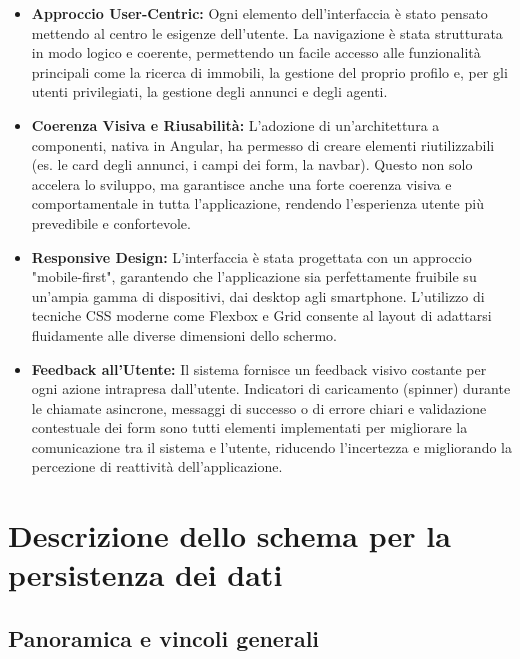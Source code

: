 \begin{itemize}
    \item \textbf{Approccio User-Centric:} Ogni elemento dell'interfaccia è stato pensato mettendo al centro le esigenze dell'utente. La navigazione è stata strutturata in modo logico e coerente, permettendo un facile accesso alle funzionalità principali come la ricerca di immobili, la gestione del proprio profilo e, per gli utenti privilegiati, la gestione degli annunci e degli agenti.

    \item \textbf{Coerenza Visiva e Riusabilità:} L'adozione di un'architettura a componenti, nativa in Angular, ha permesso di creare elementi riutilizzabili (es. le card degli annunci, i campi dei form, la navbar). Questo non solo accelera lo sviluppo, ma garantisce anche una forte coerenza visiva e comportamentale in tutta l'applicazione, rendendo l'esperienza utente più prevedibile e confortevole.

    \item \textbf{Responsive Design:} L'interfaccia è stata progettata con un approccio "mobile-first", garantendo che l'applicazione sia perfettamente fruibile su un'ampia gamma di dispositivi, dai desktop agli smartphone. L'utilizzo di tecniche CSS moderne come Flexbox e Grid consente al layout di adattarsi fluidamente alle diverse dimensioni dello schermo.

    \item \textbf{Feedback all'Utente:} Il sistema fornisce un feedback visivo costante per ogni azione intrapresa dall'utente. Indicatori di caricamento (spinner) durante le chiamate asincrone, messaggi di successo o di errore chiari e validazione contestuale dei form sono tutti elementi implementati per migliorare la comunicazione tra il sistema e l'utente, riducendo l'incertezza e migliorando la percezione di reattività dell'applicazione.
\end{itemize}


\section{Descrizione dello schema per la persistenza dei dati}

\subsection{Panoramica e vincoli generali}

